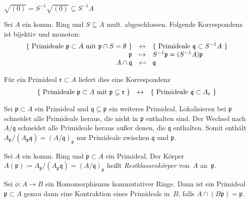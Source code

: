 \documentclass{cheat-sheet}
\newcommand{\ppp}{\mathfrak{p}}
\newcommand{\qqq}{\mathfrak{q}}
\newcommand{\rrr}{\mathfrak{r}}
\begin{document}
\begin{kor}
  $\sqrt{(0)} = S^{-1} \sqrt{(0)} \subseteq S^{-1} A$
\end{kor}


\begin{prop}
  Sei $A$ ein komm. Ring und $S \subseteq A$ mult. abgeschlossen.
  Folgende Korrespondenz ist bijektiv und monoton:
  \[
    \begin{array}{r c l}
      \{ \text{ Primideale $\ppp \subset A$ mit $\ppp \cap S = \emptyset$ } \} & \leftrightarrow & \{ \text{ Primideale $\qqq \subset S^{-1} A$ } \} \\
      \ppp & \mapsto & S^{-1} \ppp = (S^{-1} A) \ppp \\
      A \cap \qqq & \mapsfrom & \qqq
    \end{array}
  \]
\end{prop}

\begin{kor}
  Für ein Primideal $\rrr \subset A$ liefert dies eine Korrespondenz
  \[
    \begin{array}{r c l}
      \{ \text{ Primideale $\ppp \subset A$ mit $\ppp \subseteq \rrr$ } \} & \leftrightarrow & \{ \text{ Primideale $\qqq \subset A_\rrr$ } \}
    \end{array}
  \]
\end{kor}

\begin{bem}
  Sei $\ppp \subset A$ ein Primideal und $\qqq \subseteq \ppp$ ein weiteres Primideal.
  Lokalisieren bei $\ppp$ schneidet alle Primideale heraus, die nicht in $\ppp$ enthalten sind.
  Der Wechsel nach $A/\qqq$ schneidet alle Primideale heraus außer denen, die $\qqq$ enthalten.
  Somit enthält $A_\ppp / (A_\ppp \qqq) = (A/\qqq)_\ppp$ nur Primideale zwischen $\qqq$ und $\ppp$.
\end{bem}

\begin{defn}
  Sei $A$ ein komm. Ring und $\ppp \subset A$ ein Primideal.
  Der Körper $A(\ppp) \coloneqq A_\ppp / (A_\ppp \qqq) = (A/\qqq)_\ppp$ heißt \emph{Restklassenkörper} von~$A$ an~$\ppp$.
\end{defn}

\begin{prop}
  Sei $\phi : A \to B$ ein Homomorphismus kommutativer Ringe.
  Dann ist ein Primideal $\ppp \subset A$ genau dann eine Kontraktion eines Primideals in~$B$, falls $A \cap (B \ppp) = \ppp$.
\end{prop}
\end{document}
